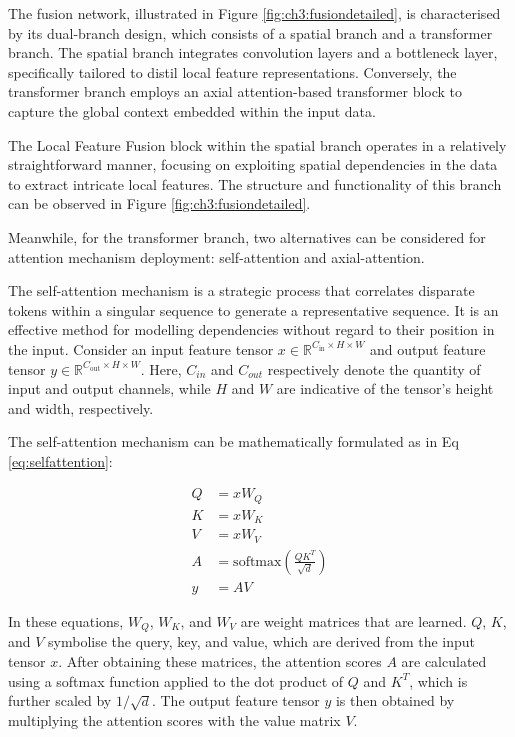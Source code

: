 The fusion network, illustrated in Figure \ref{fig:ch3:fusiondetailed}, is characterised by its dual-branch design, which consists of a spatial branch and a transformer branch. The spatial branch integrates convolution layers and a bottleneck layer, specifically tailored to distil local feature representations. Conversely, the transformer branch employs an axial attention-based transformer block to capture the global context embedded within the input data. 

The Local Feature Fusion block within the spatial branch operates in a relatively straightforward manner, focusing on exploiting spatial dependencies in the data to extract intricate local features. The structure and functionality of this branch can be observed in Figure \ref{fig:ch3:fusiondetailed}. 

Meanwhile, for the transformer branch, two alternatives can be considered for attention mechanism deployment: self-attention and axial-attention.

The self-attention mechanism is a strategic process that correlates disparate tokens within a singular sequence to generate a representative sequence. It is an effective method for modelling dependencies without regard to their position in the input. Consider an input feature tensor $x \in \mathbb{R}^{C_{\text{in}} \times H \times W}$ and output feature tensor $y \in \mathbb{R}^{C_{\text{out}} \times H \times W}$. Here, $C_{in}$ and $C_{out}$ respectively denote the quantity of input and output channels, while $H$ and $W$ are indicative of the tensor's height and width, respectively. 

The self-attention mechanism can be mathematically formulated as in Eq \ref{eq:selfattention}:

\begin{equation} \label{eq:selfattention}
\begin{split}
    Q &= xW_{Q}\\
    K &= xW_{K}\\
    V &= xW_{V}\\
    A &= \text{softmax}\left(\frac{QK^{T}}{\sqrt{d}}\right)\\
    y &= AV
\end{split}
\end{equation}

In these equations, $W_Q$, $W_K$, and $W_V$ are weight matrices that are learned. $Q$, $K$, and $V$ symbolise the query, key, and value, which are derived from the input tensor $x$. After obtaining these matrices, the attention scores $A$ are calculated using a softmax function applied to the dot product of $Q$ and $K^T$, which is further scaled by $1/\sqrt{d}$. The output feature tensor $y$ is then obtained by multiplying the attention scores with the value matrix $V$. 

